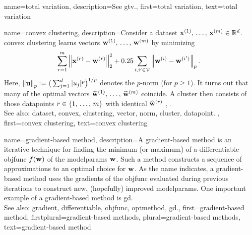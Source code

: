 {name={total variation}, 
	description={See \gls{gtv}.},
	first={total variation},
	text={total variation} 
}


 {name={convex clustering}, 
 	description={Consider a \gls{dataset} 
 		${\bf x}^{(1)}, \,\ldots, \,{\bf x}^{(m)} \in \mathbb{R}^{d}$. 
 		\Gls{convex} \gls{clustering} learns \glspl{vector} ${\bf w}^{(1)}, \,\ldots, \,{\bf w}^{(m)}$ by minimizing 
 		$$\sum_{r=1}^{m} \left\Vert {{\bf x}^{(r)} - {\bf w}^{(r)}} \right\Vert_{2}^2 + 
 		0.25 \sum_{i,i' \in \mathcal{V}} \left\Vert {{\bf w}^{(i)} - {\bf w}^{(i')}} \right\Vert_{p}.$$ 
		Here, $\left\Vert {{\bf u}} \right\Vert_{p} := \big( \sum_{j=1}^{d} |u_{j}|^{p} \big)^{1/p}$ 
		denotes the $p$-\gls{norm} (for $p\geq1$).  
		It turns out that many of the optimal \glspl{vector} $\widehat{{\bf w}}^{(1)}, \,\ldots, \,\widehat{{\bf w}}^{(m)}$ 
		coincide. A \gls{cluster} then consists of those \glspl{datapoint} $r \in \{1, \,\ldots, \,m\}$ 
		with identical $\widehat{{\bf w}}^{(r)}$ \cite{JMLR:v22:18-694}, \cite{Pelckmans2005}. 
			\\
		See also: \gls{dataset}, \gls{convex}, \gls{clustering}, \gls{vector}, \gls{norm}, \gls{cluster}, \gls{datapoint}. },
 	first={convex clustering},
	text={convex clustering} 
}


{name={gradient-based method}, 
	description={A \Gls{gradient}-based 
		method is an iterative technique for finding the \gls{minimum} (or \gls{maximum}) 
		of a \gls{differentiable} \gls{objfunc} $f({\bf w})$ of the \gls{modelparams} ${\bf w}$. 
		Such a method constructs a sequence of approximations to an optimal choice for ${\bf w}$. 
		As the name indicates, a \gls{gradient}-based method uses the \glspl{gradient} 
		of the \gls{objfunc} evaluated during previous iterations to construct new, 
		(hopefully) improved \gls{modelparams}. One important example of a \gls{gradient}-based 
		method is \gls{gd}.
				\\
		See also: \gls{gradient}, \gls{differentiable}, \gls{objfunc}, \gls{optmethod}, \gls{gd}.},
	first={gradient-based method},
	firstplural={gradient-based methods},
	plural={gradient-based methods},
	text={gradient-based method} 
}


